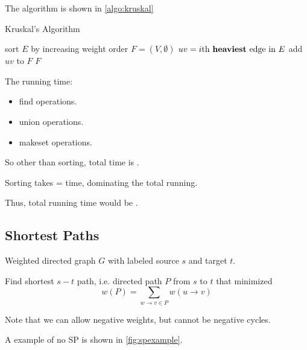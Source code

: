 The algorithm is shown in \cref{algo:kruskal}

\begin{algorithm}[H]
    \caption{Kruskal's Algorithm}\label{algo:kruskal}
    \begin{algorithmic}[1]
            \State sort $E$ by increasing weight order
            \State $F = (V, \emptyset)$
            \EndFor
            \State $uv = i\text{th \textbf{heaviest} edge in } E$
                    \State {}
                    \State add $uv$ to $F$
                \EndIf
            \EndFor
            \Return $F$
        \EndProcedure
    \end{algorithmic}
\end{algorithm}

\analysis

The running time:
\begin{itemize}
    \item {} find operations.
    \item {} union operations.
    \item {} makeset operations.
\end{itemize}
So other than sorting, total time is .

Sorting takes  =  time,
dominating the total running.

Thus, total running time would be .

\subsection{Shortest Paths}
\AlgoInput Weighted directed graph $G$ with labeled
source $s$ and target $t$.

\AlgoOutput Find shortest $s-t$ path, i.e. directed
path $P$ from $s$ to $t$ that minimized
\[w(P) = \sum_{w \rightarrow v \in P}w(u \rightarrow v)\]

Note that we can allow negative weights,
but cannot be negative cycles.

A example of no SP is shown in \cref{fig:spexample}.

